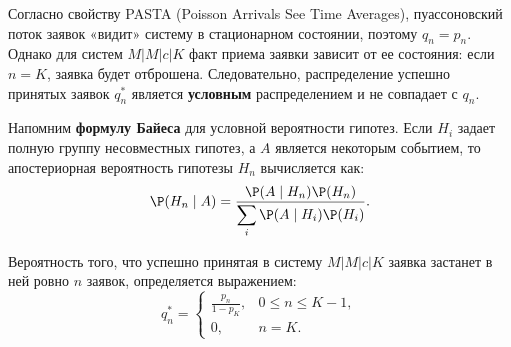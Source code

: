 Согласно свойству PASTA (Poisson Arrivals See Time Averages), пуассоновский поток заявок «видит» систему в стационарном состоянии, поэтому $q_n = p_n$. Однако для систем $M|M|c|K$ факт приема заявки зависит от ее состояния: если $n = K$, заявка будет отброшена. Следовательно, распределение успешно принятых заявок $q_n^*$ является \textbf{условным} распределением и не совпадает с $q_n$.

\begin{note}
Напомним \textbf{формулу Байеса} для условной вероятности гипотез. Если $H_i$ задает полную группу несовместных гипотез, а $A$ является некоторым событием, то апостериорная вероятность гипотезы $H_n$ вычисляется как:
$$
\P(H_n \mid A) = \frac{\P(A \mid H_n) \P(H_n)}{\dsum_{i} \P(A \mid H_i) \P(H_i)}.
$$
\end{note}

\begin{statement}
Вероятность того, что успешно принятая в систему $M|M|c|K$ заявка застанет в ней ровно $n$ заявок, определяется выражением:
$$
q_n^* = 
\begin{cases}
\displaystyle \frac{p_n}{1 - p_K}, & 0 \le n \le K-1, \\
0, & n = K.
\end{cases}
$$
\end{statement}

